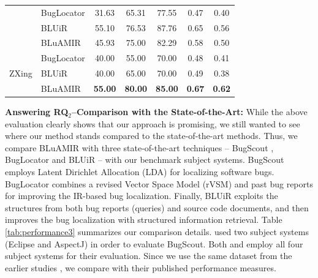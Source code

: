 \documentclass[sigconf,review,anonymous]{acmart}
\begin{document}
\begin{table}[!tb]
{\begin{tabular}{l|l|c|c|c|c|c}
			& BugLocator & 31.63 & 65.31 & 77.55 & 0.47 & 0.40 \\  \cline{2-7} 
			& BLUiR & 55.10 & 76.53 & 87.76 & 0.65  & 0.56 \\  \cline{2-7} &BLuAMIR                                                                     & 45.93                                               & 75.00                                              & 82.29                                             &   0.58  &   0.50  \\ \hline \hline
			\multirow{4}{*}{ZXing}                  
			
			
			& BugLocator & 40.00 & 55.00 & 70.00 & 0.48 & 0.41 \\  \cline{2-7}  
			& BLUiR & 40.00 & 65.00 & 70.00 & 0.49  & 0.38 \\  \cline{2-7}
			&BLuAMIR                                                                  & \textbf{55.00}                                            & \textbf{80.00}                                           & \textbf{85.00}                                             &   \textbf{0.67}  &  \textbf{0.62}   \\ \hline
			
			
			
			
		\end{tabular}
		
	}
	\centering
\end{table}
\textbf{Answering RQ$_2$--Comparison with the State-of-the-Art:} While the above evaluation clearly shows that our approach is promising, we still wanted to see where our method stands compared to the state-of-the-art methods. Thus, 
we compare BLuAMIR with three state-of-the-art techniques -- BugScout \cite{Nguyen}, BugLocator \cite{Jian} and BLUiR \cite{Saha} -- with our benchmark subject systems. 
BugScout employs Latent Dirichlet Allocation (LDA) for localizing software bugs. BugLocator combines a revised Vector Space Model (rVSM) and past bug reports for improving the IR-based bug localization. Finally, BLUiR exploits the structures from both bug reports (queries) and source code documents, and then improves the bug localization with structured information retrieval.    
Table \ref{tab:performance3} summarizes our comparison details.
\citet{Nguyen} used two subject systems (Eclipse and AspectJ) in order to evaluate BugScout.
Both \citet{Saha} and \citet{Jian} employ all four subject systems for their evaluation. Since we use the same dataset from the earlier studies \cite{Saha,Jian}, we compare with their published performance measures. 
\end{document}
